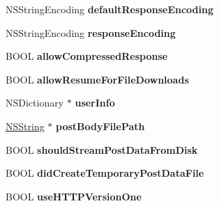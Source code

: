 \begin{DoxyCompactItemize}
\item 
\hypertarget{interface_a_s_i_h_t_t_p_request_a1fe0eb0f3d7ed3ac013b491f0cd7279d}{
NSStringEncoding {\bfseries defaultResponseEncoding}}
\label{interface_a_s_i_h_t_t_p_request_a1fe0eb0f3d7ed3ac013b491f0cd7279d}

\item 
\hypertarget{interface_a_s_i_h_t_t_p_request_a96f447d1b4f35211e6fbaa8c4c703731}{
NSStringEncoding {\bfseries responseEncoding}}
\label{interface_a_s_i_h_t_t_p_request_a96f447d1b4f35211e6fbaa8c4c703731}

\item 
\hypertarget{interface_a_s_i_h_t_t_p_request_a135836ee95f26de7f6015612ddf651c1}{
BOOL {\bfseries allowCompressedResponse}}
\label{interface_a_s_i_h_t_t_p_request_a135836ee95f26de7f6015612ddf651c1}

\item 
\hypertarget{interface_a_s_i_h_t_t_p_request_acd586da51d61c2898f531d2c5531d18c}{
BOOL {\bfseries allowResumeForFileDownloads}}
\label{interface_a_s_i_h_t_t_p_request_acd586da51d61c2898f531d2c5531d18c}

\item 
\hypertarget{interface_a_s_i_h_t_t_p_request_a05f7e9533c34b6d01487a79c3829ad06}{
NSDictionary $\ast$ {\bfseries userInfo}}
\label{interface_a_s_i_h_t_t_p_request_a05f7e9533c34b6d01487a79c3829ad06}

\item 
\hypertarget{interface_a_s_i_h_t_t_p_request_a16606cdeb9efbeed811ce1675a81f985}{
\hyperlink{class_n_s_string}{NSString} $\ast$ {\bfseries postBodyFilePath}}
\label{interface_a_s_i_h_t_t_p_request_a16606cdeb9efbeed811ce1675a81f985}

\item 
\hypertarget{interface_a_s_i_h_t_t_p_request_a3403d8d3fd282208597a93fa5f1ae4af}{
BOOL {\bfseries shouldStreamPostDataFromDisk}}
\label{interface_a_s_i_h_t_t_p_request_a3403d8d3fd282208597a93fa5f1ae4af}

\item 
\hypertarget{interface_a_s_i_h_t_t_p_request_af5b23e2e04c95c41d2d79b08fa61ee07}{
BOOL {\bfseries didCreateTemporaryPostDataFile}}
\label{interface_a_s_i_h_t_t_p_request_af5b23e2e04c95c41d2d79b08fa61ee07}

\item 
\hypertarget{interface_a_s_i_h_t_t_p_request_ad099421dd390ea746afcae13b436b389}{
BOOL {\bfseries useHTTPVersionOne}}
\label{interface_a_s_i_h_t_t_p_request_ad099421dd390ea746afcae13b436b389}


\end{DoxyCompactItemize}
